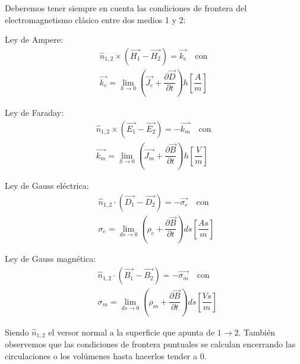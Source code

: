 Deberemos tener siempre en cuenta las condiciones de frontera del electromagnetismo clásico entre dos medios 1 y 2:

Ley de Ampere:
\begin{equation}
\begin{aligned}
	&\hat{n}_{1,2} \times(\overrightarrow{H_{1}}-\overrightarrow{H_{2}})  = \overrightarrow{k_{e}} \quad \text{con}  \quad	\\
	&\overrightarrow{k_{e}}=\lim_{h\rightarrow 0} 	\left(\overrightarrow{J_{e}}+\dfrac{\partial \overrightarrow{D}}{\partial t} \right) h \left[ \dfrac{A}{m}\right] 
\end{aligned}
\end{equation}

Ley de Faraday:
\begin{equation}
\begin{aligned}
	& \hat{n}_{1,2} \times(\overrightarrow{E_{1}}-\overrightarrow{E_{2}}) = -\overrightarrow{k_{m}} \quad \text{con}  \quad	\\
	&\overrightarrow{k_{m}}=\lim_{h\rightarrow 0} 	\left(\overrightarrow{J_{m}}+\dfrac{\partial \overrightarrow{B}}{\partial t} \right) h \left[ \dfrac{V}{m}\right] 
\end{aligned}
\end{equation}

Ley de Gauss eléctrica:
\begin{equation}
\begin{aligned}
	& \hat{n}_{1,2} \cdot (\overrightarrow{D_{1}}-\overrightarrow{D_{2}}) = -\overrightarrow{\sigma_{e}} \quad \text{con}  \quad	\\
	&\sigma_{e}=\lim_{ds\rightarrow 0} 	\left(\rho_{e}+\dfrac{\partial \overrightarrow{B}}{\partial t} \right) ds \left[ \dfrac{As}{m}\right] 
\end{aligned}
\end{equation}

Ley de Gauss magnética: 
\begin{equation}
\begin{aligned}
	& \hat{n}_{1,2} \cdot (\overrightarrow{B_{1}}-\overrightarrow{B_{2}}) = -\overrightarrow{\sigma_{m}} \quad \text{con}  \quad	\\
	&\sigma_{m}=\lim_{ds\rightarrow 0} 	\left(\rho_{m}+\dfrac{\partial \overrightarrow{B}}{\partial t} \right) ds \left[ \dfrac{Vs}{m}\right] 
\end{aligned}
\end{equation}

Siendo $\hat{n}_{1,2}$ el versor normal a la superficie que apunta de $1 \rightarrow 2$. También  observemos que las condiciones de frontera puntuales se calculan encerrando las circulaciones o los volúmenes hasta hacerlos tender a 0.

